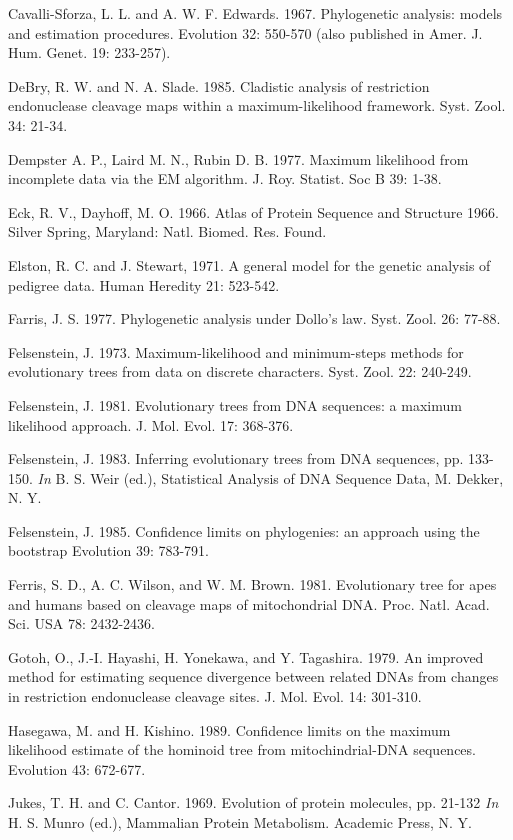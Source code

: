 {
\setlength{\parindent}{-2.0em}

Cavalli-Sforza, L. L.  and A. W. F. Edwards. 1967. Phylogenetic analysis:
models and estimation procedures.  Evolution 32: 550-570 (also
published in Amer. J. Hum. Genet. 19: 233-257).

DeBry, R. W. and N. A. Slade. 1985.  Cladistic analysis of restriction
endonuclease cleavage maps within a maximum-likelihood framework.
Syst. Zool.  34: 21-34.

Dempster A. P., Laird M. N., Rubin D. B. 1977. Maximum likelihood from incomplete
data via the EM algorithm. J. Roy. Statist. Soc B 39: 1-38.

Eck, R. V., Dayhoff, M. O.  1966.  Atlas of Protein Sequence and Structure
 1966. Silver Spring, Maryland: Natl. Biomed. Res. Found.

Elston, R. C. and J. Stewart, 1971.  A general model for the genetic analysis
of pedigree data.  Human Heredity 21: 523-542.

Farris, J. S.  1977.  Phylogenetic analysis under Dollo's law. Syst. Zool.
26: 77-88.

Felsenstein, J. 1973.  Maximum-likelihood and minimum-steps methods for
evolutionary trees from data on discrete characters. Syst. Zool.
22: 240-249.

Felsenstein, J.  1981.  Evolutionary trees from DNA sequences: a maximum
likelihood approach.  J. Mol. Evol. 17: 368-376.

Felsenstein, J.  1983.  Inferring evolutionary trees from DNA sequences,
pp. 133-150. {\it In} B. S. Weir (ed.), Statistical Analysis of DNA Sequence Data, 
M. Dekker, N. Y.

Felsenstein, J. 1985.  Confidence limits on phylogenies: an approach using the bootstrap
Evolution 39: 783-791.

Ferris, S. D., A. C. Wilson, and W. M. Brown. 1981.  Evolutionary tree for apes
and humans based on cleavage maps of mitochondrial DNA.  Proc. Natl. Acad.
Sci. USA  78: 2432-2436.

Gotoh, O., J.-I. Hayashi, H. Yonekawa, and Y. Tagashira.  1979.  An improved
method for estimating sequence divergence between related DNAs from changes
in restriction endonuclease cleavage sites. J. Mol. Evol.  14: 301-310.

Hasegawa, M. and H. Kishino.  1989.  Confidence limits on the maximum
likelihood estimate of the hominoid tree from mitochindrial-DNA sequences.
Evolution 43: 672-677.

Jukes, T. H. and C. Cantor.  1969.  Evolution of protein molecules, pp. 21-132 {\it In} H. S. Munro (ed.), Mammalian Protein Metabolism. Academic Press, N. Y.

}
